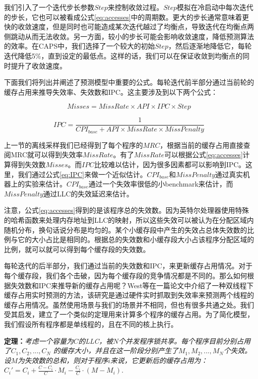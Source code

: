 我们引入了一个迭代步长参数$Step$来控制收敛过程。$Step$模拟在冷启动中每次迭代的步长，它也可以被看成公式\ref{eq:accesses}中的周期数。更大的步长通常意味着更快的收敛速度，但是同时也可能造成某次迭代越过了均衡点，导致迭代在均衡点两侧跳动从而无法收敛。另一方面，较小的步长可能会影响收敛速度，降低预测算法的效率。在CAPS中，我们选择了一个较大的初始$Step$，然后逐渐地降低它，每轮迭代降低5\%，直到设定的最低点。这样的话，我们可以在保证收敛到均衡点的同时提升了收敛速度。

下面我们将列出并阐述了预测模型中重要的公式。每轮迭代前半部分通过当前轮的缓存占用来推导失效率、失效数和IPC。这主要涉及到以下两个公式：

\begin{equation}
Misses = MissRate \times API \times IPC \times Step 
\label{eq:accesses}
\end{equation}

\begin{equation}
IPC = \frac{1}{CPI_{base} + API \times MissRate \times MissPenalty}
\label{eq:IPC}
\end{equation}

上一节的离线采样我们已经得到了每个程序的$MRC$，根据当前的缓存占用直接查阅MRC就可以得到失效率$MissRate$。有了$MissRate$可以根据公式\ref{eq:accesses}计算得到失效数$Misses$。而$IPC$比较难以估计，因为很多因素都可以影响到IPC。这里，我们通过公式\ref{eq:IPC}来做一个近似估计。$CPI_{base}$和$MissPenalty$通过真实机器上的实验来估计。$CPI_{base}$通过一个失效率很低的小benchmark来估计，而$MissPenalty$通过LLC的失效延迟来估计。   

注意，公式\ref{eq:accesses}得到的是该程序总的失效数。因为英特尔处理器使用特殊的哈希函数来处理内存地址到LLC的映射，所以这些失效可以被认为在分配区域内随机分布，换句话说分布是均匀的。某个小缓存段中产生的失效占总体失效数的比例与它的大小占比是相同的。根据总的失效数和小缓存段大小占该程序分配区域的比例，就可以就可以得到每个缓存段的失效数。

每轮迭代的后半部分，我们通过当前的失效数和IPC，来更新缓存占用情况。对于每个缓存段，我们各个击破，因为每个缓存段的竞争情况都是不同的。那么如何根据失效数和IPC来推导新的缓存占用呢？West等在一篇论文中介绍了一种双线程下缓存占用实时预测的方法\parencite{west2010online}，该研究是通过硬件实时抓取到失效率来预测两个线程的缓存占用情况。虽然使用场景与我们的场景并不相同，但也有很多共通之处。我们受其启发，建立了一个类似的定理用来计算多个程序的缓存占用。为了简化模型，我们假设所有程序都是单线程的，且在不同的核上执行。

\textbf{定理：}\emph{考虑一个容量为$C$的LLC，被$N$个并发程序锁共享。每个程序目前分别占用了$C_1, C_2, ... , C_N$ 的缓存大小，并且在这一阶段分别产生了$M_1, M_2, ... , M_N$个失效。设$M$为失效数的总和，则对于程序$i$来说，它更新后的缓存占用为：$C_i' = C_i + \frac{C-C_i}{C} \cdot M_i - \frac{C_i}{C} \cdot (M-M_i)$.}

